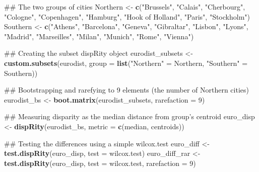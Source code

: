 \documentclass[]{book}
\newenvironment{Shaded}{\begin{snugshade}}{\end{snugshade}}
\newcommand{\KeywordTok}[1]{\textcolor[rgb]{0.13,0.29,0.53}{\textbf{#1}}}
\newcommand{\DataTypeTok}[1]{\textcolor[rgb]{0.13,0.29,0.53}{#1}}
\newcommand{\DecValTok}[1]{\textcolor[rgb]{0.00,0.00,0.81}{#1}}
\newcommand{\StringTok}[1]{\textcolor[rgb]{0.31,0.60,0.02}{#1}}
\newcommand{\NormalTok}[1]{#1}
\theoremstyle{definition}
\theoremstyle{definition}
\theoremstyle{remark}
\begin{document}
\begin{Shaded}
\begin{Highlighting}[]
\NormalTok{## The two groups of cities}
\NormalTok{Northern <-}\StringTok{ }\KeywordTok{c}\NormalTok{(}\StringTok{"Brussels"}\NormalTok{, }\StringTok{"Calais"}\NormalTok{, }\StringTok{"Cherbourg"}\NormalTok{, }\StringTok{"Cologne"}\NormalTok{, }\StringTok{"Copenhagen"}\NormalTok{,}
              \StringTok{"Hamburg"}\NormalTok{, }\StringTok{"Hook of Holland"}\NormalTok{, }\StringTok{"Paris"}\NormalTok{, }\StringTok{"Stockholm"}\NormalTok{)}
\NormalTok{Southern <-}\StringTok{ }\KeywordTok{c}\NormalTok{(}\StringTok{"Athens"}\NormalTok{, }\StringTok{"Barcelona"}\NormalTok{, }\StringTok{"Geneva"}\NormalTok{, }\StringTok{"Gibraltar"}\NormalTok{, }\StringTok{"Lisbon"}\NormalTok{, }\StringTok{"Lyons"}\NormalTok{,}
              \StringTok{"Madrid"}\NormalTok{, }\StringTok{"Marseilles"}\NormalTok{, }\StringTok{"Milan"}\NormalTok{, }\StringTok{"Munich"}\NormalTok{, }\StringTok{"Rome"}\NormalTok{, }\StringTok{"Vienna"}\NormalTok{)}

\NormalTok{## Creating the subset dispRity object}
\NormalTok{eurodist_subsets <-}\StringTok{ }\KeywordTok{custom.subsets}\NormalTok{(eurodist, }\DataTypeTok{group =} \KeywordTok{list}\NormalTok{(}\StringTok{"Northern"}\NormalTok{ =}\StringTok{ }\NormalTok{Northern,}
                                                        \StringTok{"Southern"}\NormalTok{ =}\StringTok{ }\NormalTok{Southern))}

\NormalTok{## Bootstrapping and rarefying to 9 elements (the number of Northern cities)}
\NormalTok{eurodist_bs <-}\StringTok{ }\KeywordTok{boot.matrix}\NormalTok{(eurodist_subsets, }\DataTypeTok{rarefaction =} \DecValTok{9}\NormalTok{)}

\NormalTok{## Measuring disparity as the median distance from group's centroid}
\NormalTok{euro_disp <-}\StringTok{ }\KeywordTok{dispRity}\NormalTok{(eurodist_bs, }\DataTypeTok{metric =} \KeywordTok{c}\NormalTok{(median, centroids))}

\NormalTok{## Testing the differences using a simple wilcox.test}
\NormalTok{euro_diff <-}\StringTok{ }\KeywordTok{test.dispRity}\NormalTok{(euro_disp, }\DataTypeTok{test =}\NormalTok{ wilcox.test)}
\NormalTok{euro_diff_rar <-}\StringTok{ }\KeywordTok{test.dispRity}\NormalTok{(euro_disp, }\DataTypeTok{test =}\NormalTok{ wilcox.test, }\DataTypeTok{rarefaction =} \DecValTok{9}\NormalTok{)}
\end{Highlighting}
\end{Shaded}
\end{document}
